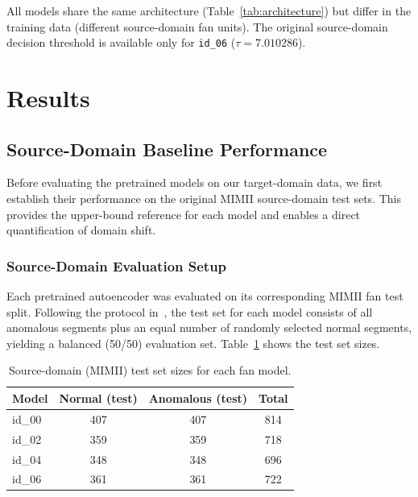 \documentclass[12pt, a4paper]{article}
\begin{document}
All models share the same architecture (Table~\ref{tab:architecture}) but differ in the training data (different source-domain fan units). The original source-domain decision threshold is available only for \texttt{id\_06} ($\tau = 7.010286$).


\section{Results}
\label{sec:results}

\subsection{Source-Domain Baseline Performance}
\label{sec:source-domain}

Before evaluating the pretrained models on our target-domain data, we first establish their performance on the original MIMII source-domain test sets. This provides the upper-bound reference for each model and enables a direct quantification of domain shift.

\subsubsection{Source-Domain Evaluation Setup}

Each pretrained autoencoder was evaluated on its corresponding MIMII fan test split. Following the protocol in~\cite{purohit2019mimii}, the test set for each model consists of all anomalous segments plus an equal number of randomly selected normal segments, yielding a balanced (50/50) evaluation set. Table~\ref{tab:source-samples} shows the test set sizes.

\begin{table}[htbp]
\centering
\caption{Source-domain (MIMII) test set sizes for each fan model.}
\label{tab:source-samples}
\begin{tabular}{lccc}
\toprule
Model & Normal (test) & Anomalous (test) & Total \\
\midrule
id\_00 & 407 & 407 & 814 \\
id\_02 & 359 & 359 & 718 \\
id\_04 & 348 & 348 & 696 \\
id\_06 & 361 & 361 & 722 \\
\bottomrule
\end{tabular}
\end{table}
\end{document}
